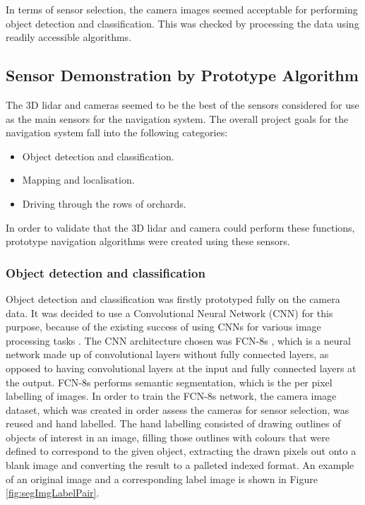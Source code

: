 \documentclass[preprint,authoryear,12pt]{elsarticle}
\begin{document}
    In terms of sensor selection, the camera images seemed acceptable for performing object detection and classification. This was checked by processing the data using readily accessible algorithms.

\subsection{Sensor Demonstration by Prototype Algorithm}
    The 3D lidar and cameras seemed to be the best of the sensors considered for use as the main sensors for the navigation system. The overall project goals for the navigation system fall into the following categories:
    \begin{itemize}
    \item Object detection and classification.
    \item Mapping and localisation.
    \item Driving through the rows of orchards.
    \end{itemize}
    In order to validate that the 3D lidar and camera could perform these functions, prototype navigation algorithms were created using these sensors.

\subsubsection{Object detection and classification}
    Object detection and classification was firstly prototyped fully on the camera data. It was decided to use a Convolutional Neural Network (CNN) for this purpose, because of the existing success of using CNNs for various image processing tasks \citep{LeCun2015}. The CNN architecture chosen was FCN-8s \citep{long2015}, which is a neural network made up of convolutional layers without fully connected layers, as opposed to having convolutional layers at the input and fully connected layers at the output. FCN-8s performs semantic segmentation, which is the per pixel labelling of images.
    In order to train the FCN-8s network, the camera image dataset, which was created in order assess the cameras for sensor selection, was reused and hand labelled. The hand labelling consisted of drawing outlines of objects of interest in an image, filling those outlines with colours that were defined to correspond to the given object, extracting the drawn pixels out onto a blank image and converting the result to a palleted indexed format. An example of an original image and a corresponding label image is shown in Figure \ref{fig:segImgLabelPair}.
\end{document}
